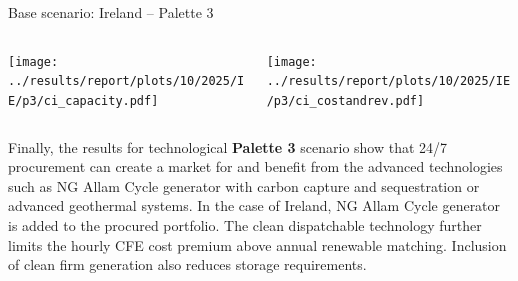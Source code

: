 \begin{frame}{Base scenario: Ireland -- Palette 3}

  {\footnotesize

  \begin{columns}
  \begin{column}{7cm}
  \centering
  \texttt{[image: ../results/report/plots/10/2025/IE/p3/ci\_capacity.pdf]}
  \end{column}

  \begin{column}{8cm}
  \centering
  \texttt{[image: ../results/report/plots/10/2025/IE/p3/ci\_costandrev.pdf]}
  \end{column}

  \end{columns}

  \begin{columns}
  \begin{column}{15cm}
  Finally, the results for technological {\bf Palette 3} scenario show that 24/7 procurement
  can create a market for and benefit from the advanced technologies such as 
  NG Allam Cycle generator with carbon capture and sequestration or 
  advanced geothermal systems. 
  In the case of Ireland, NG Allam Cycle generator is added to the 
  procured portfolio. The clean dispatchable technology \alert{further limits 
  the hourly CFE cost premium} above annual renewable matching. 
  Inclusion of clean firm generation also reduces storage requirements.
  \end{column}
  \end{columns}
  }

\end{frame}



